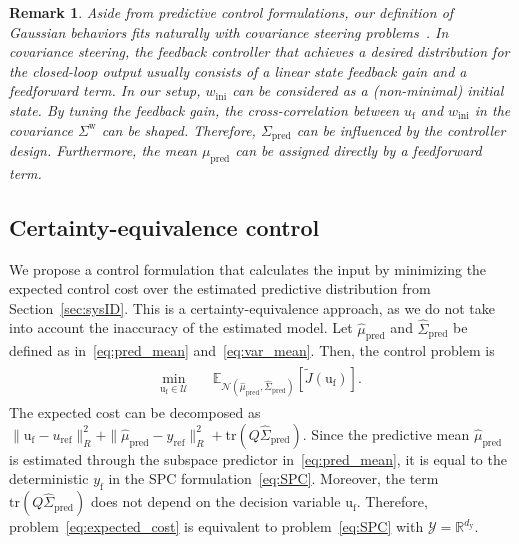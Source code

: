 \documentclass[letterpaper, 10 pt, conference]{ieeeconf}
\def\wi{w_\mathrm{ini}}
\def\uf{u_\mathrm{f}}
\def\ufr{\mathrm{u}_\mathrm{f}}
\def\ur{u_\mathrm{ref}}
\def\yr{y_\mathrm{ref}}
\def\mp{\mu_\mathrm{pred}}
\def\mph{\hat{\mu}_\mathrm{pred}}
\def\Sw{\Sigma^\mathrm{w}}
\def\Sp{\Sigma_\mathrm{pred}}
\def\Sph{\hat{\Sigma}_\mathrm{pred}}
\def\dy{d_\mathrm{y}}
\newtheorem{rmk}{Remark}
\begin{document}
\begin{rmk}
    Aside from predictive control formulations, our definition of Gaussian behaviors fits naturally with covariance steering problems~\cite{chen2015optimal,liu2024optimal,pilipovsky2023data,aolaritei2022distributional}.
    In covariance steering, the feedback controller that achieves a desired distribution for the closed-loop output usually consists of a linear state feedback gain and a feedforward term.
    In our setup, $\wi$ can be considered as a (non-minimal) initial state.    
    By tuning the feedback gain, the cross-correlation between $\uf$ and $\wi$ in the covariance $\Sw$ can be shaped.
    Therefore, $\Sp$ can be influenced by the controller design.
    Furthermore, the mean $\mp$ can be assigned directly by a feedforward term.   \hfill\QED
\end{rmk}


\subsection{Certainty-equivalence control}
We propose a control formulation that calculates the input by minimizing the expected control cost over the estimated predictive distribution from Section~\ref{sec:sysID}.
This is a certainty-equivalence approach, as we do not take into account the inaccuracy of the estimated model.
Let $\mph$ and $\Sph$ be defined as in~\eqref{eq:pred_mean} and~\eqref{eq:var_mean}.
Then, the control problem is
\begin{align} \label{eq:expected_cost}
\begin{split}
    \min_{\ufr\in\mathcal{U}} & \quad \mathbb{E}_{\mathcal{N}\left(\mph,\Sph \right)}[\tilde{J}(\ufr)].
\end{split}
\end{align}
The expected cost can be decomposed as $\|\ufr-\ur\|_{R}^2 + \|\mph-\yr\|_{R}^2 + \mathrm{tr}(Q\Sph)$. Since the predictive mean $\mph$ is estimated through the subspace predictor in~\eqref{eq:pred_mean}, it is equal to the deterministic $y_\mathrm{f}$ in the \gls{SPC} formulation~\eqref{eq:SPC}.
Moreover, the term $\mathrm{tr}(Q\Sph)$ does not depend on the decision variable $\ufr$.
Therefore, problem~\eqref{eq:expected_cost} is equivalent to problem~\eqref{eq:SPC} with $\mathcal{Y}=\mathbb{R}^{\dy}$.
\end{document}
